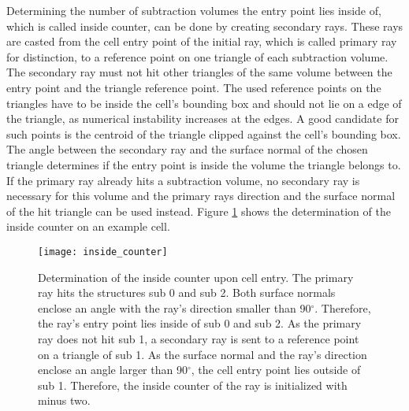 Determining the number of subtraction volumes the entry point lies inside of, which is called inside counter, can be done by creating secondary rays. These rays are casted from the cell entry point of the initial ray, which is called primary ray for distinction, to a reference point on one triangle of each subtraction volume. The secondary ray must not hit other triangles of the same volume between the entry point and the triangle reference point. The used reference points on the triangles have to be inside the cell's bounding box and should not lie on a edge of the triangle, as numerical instability increases at the edges. A good candidate for such points is the centroid of the triangle clipped against the cell's bounding box. The angle between the secondary ray and the surface normal of the chosen triangle determines if the entry point is inside the volume the triangle belongs to. If the primary ray already hits a subtraction volume, no secondary ray is necessary for this volume and the primary rays direction and the surface normal of the hit triangle can be used instead. Figure \ref{fig:inside_counter} shows the determination of the inside counter on an example cell.

\begin{figure}
\centering
\texttt{[image: inside\_counter]}
\caption{Determination of the inside counter upon cell entry. The primary ray hits the structures sub 0 and sub 2. Both surface normals enclose an angle with the ray's direction smaller than 90$^\circ$. Therefore, the ray's entry point lies inside of sub 0 and sub 2. As the primary ray does not hit sub 1, a secondary ray is sent to a reference point on a triangle of sub 1. As the surface normal and the ray's direction enclose an angle larger than 90$^\circ$, the cell entry point lies outside of sub 1. Therefore, the inside counter of the ray is initialized with minus two.}
\label{fig:inside_counter}
\end{figure}
